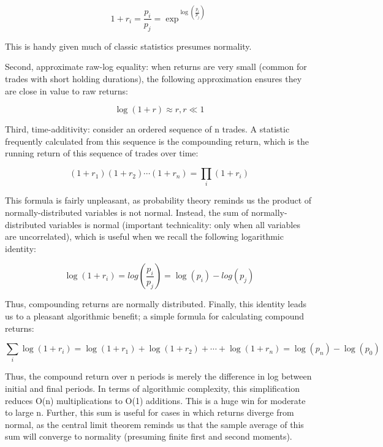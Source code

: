 \documentclass[a4paper,10pt]{scrbook}
\begin{document}
 \begin{equation}
    1 + r_i = \frac{p_i}{p_j} = \exp^{\log(\frac{p_i}{p_j})} 
 \end{equation}

This is handy given much of classic statistics presumes normality.

Second, approximate raw-log equality: when returns are very small (common for trades with short holding durations), the following approximation ensures they are close in value to raw returns:

\begin{equation}
    \log(1 + r) \approx r , r \ll 1 
\end{equation}

Third, time-additivity: consider an ordered sequence of n trades. A statistic frequently calculated from this sequence is the compounding return, which is the running return of this sequence of trades over time:

 \begin{equation}
 (1 + r_1)(1 + r_2)  \cdots (1 + r_n) = \prod_i (1+r_i)
 \end{equation}
 
This formula is fairly unpleasant, as probability theory reminds us the product of normally-distributed variables is not normal. Instead, the sum of normally-distributed variables is normal (important technicality: only when all variables are uncorrelated), which is useful when we recall the following logarithmic identity:

    \begin{equation}
    \log(1 + r_i) = log(\frac{p_i}{p_j}) = \log(p_i) - log(p_j) 
    \end{equation}

Thus, compounding returns are normally distributed. Finally, this identity leads us to a pleasant algorithmic benefit; a simple formula for calculating compound returns:

    \begin{equation}
    \sum_i \log(1+r_i) = \log(1 + r_1) + \log(1 + r_2)  + \cdots + \log(1 + r_n) = \log(p_n) - \log(p_0)
    \end{equation}

Thus, the compound return over n periods is merely the difference in log between initial and final periods. In terms of algorithmic complexity, this simplification reduces O(n) multiplications to O(1) additions. This is a huge win for moderate to large n. Further, this sum is useful for cases in which returns diverge from normal, as the central limit theorem reminds us that the sample average of this sum will converge to normality (presuming finite first and second moments).
\end{document}
